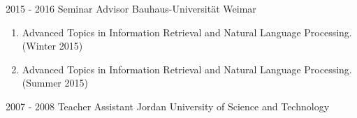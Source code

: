 
\cvevent
{2015 - 2016} %
{Seminar Advisor} %
{Bauhaus-Universität Weimar} %

\begin{enumerate}
\item {Advanced Topics in Information Retrieval and Natural Language Processing. (Winter 2015)}
\item {Advanced Topics in Information Retrieval and Natural Language Processing. (Summer 2015)}
\end{enumerate}

\cvevent
{2007 - 2008} %
{Teacher Assistant} %
{Jordan University of Science and Technology} %


